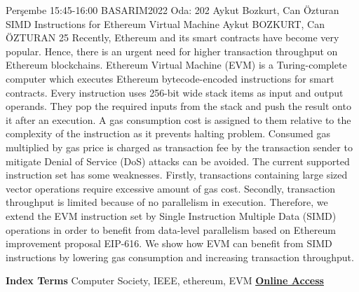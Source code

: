 
    \begin{abstract_basarim}
    {Perşembe 15:45-16:00}
    {BASARIM2022}
    {Oda: 202}
    {Aykut Bozkurt, Can Özturan}
    {SIMD Instructions for Ethereum Virtual Machine}
    {%
    Aykut BOZKURT, Can ÖZTURAN}
    {%
    }
    {%
    25}
    Recently, Ethereum and its smart contracts have become very popular. Hence, there is an urgent need for higher transaction throughput on Ethereum blockchains. Ethereum Virtual Machine (EVM) is a Turing-complete computer which executes Ethereum bytecode-encoded instructions for smart contracts. Every instruction uses 256-bit wide stack items as input and output operands. They pop the required inputs from the stack and push the result onto it after an execution. A gas consumption cost is assigned to them relative to the complexity of the instruction as it prevents halting problem. Consumed gas multiplied by gas price is charged as transaction fee by the transaction sender to mitigate Denial of Service (DoS) attacks can be avoided. The current supported instruction set has some weaknesses. Firstly, transactions containing large sized vector operations require excessive amount of gas cost. Secondly, transaction throughput is limited because of no parallelism in execution. Therefore, we extend the EVM instruction set by Single Instruction Multiple Data (SIMD) operations in order to benefit from data-level parallelism based on Ethereum improvement proposal EIP-616. We show how EVM can benefit from SIMD instructions by lowering gas consumption and increasing transaction throughput. 
    
            \textbf{Index Terms} \newline{}Computer Society, IEEE, ethereum, EVM
     \newline\newline\noindent \href{https://drive.google.com/file/d/1G21ovwck5gjelHhO2W6Vf2vnm9mGLyge/view?usp=drivesdk}{\bfseries Online Access}
    \end{abstract_basarim}
    